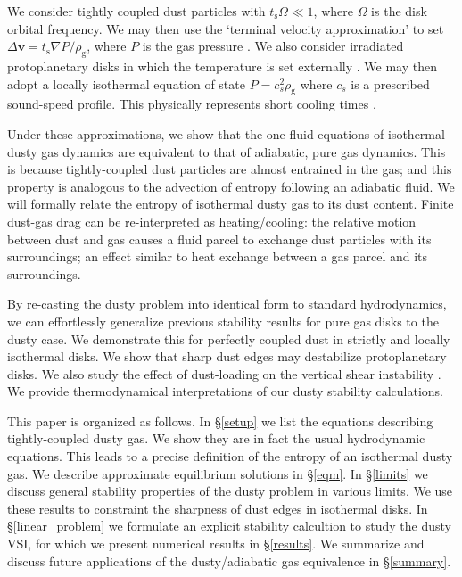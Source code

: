 \documentclass[iop, numberedappendix]{emulateapj}
\newcommand{\rhog}{\rho_\mathrm{g}}
\newcommand{\tstop}{t_\mathrm{s}}
\begin{document}
We consider tightly coupled dust particles with $\tstop\Omega\ll
1$, where $\Omega$ is the disk orbital frequency. We may then use the
`terminal velocity approximation' to set $\Delta \bm{v} = \tstop\nabla
P/\rhog$, where $P$ is the gas pressure \citep{youdin05a,
  jacquet11,laibe14}. We also consider irradiated protoplanetary disks 
in which the temperature is set externally \citep{chiang97,stam08}. We
may then adopt a locally isothermal equation of state $P = c_s^2\rhog$
where $c_s$ is a prescribed sound-speed profile.  This physically
represents short cooling times \citep{lin15}. 

Under these approximations, we show that the one-fluid equations of 
isothermal dusty gas dynamics are equivalent to that of adiabatic, pure gas
dynamics. This is because tightly-coupled dust particles are almost
entrained in the gas; and this property is analogous to the advection
of entropy following an adiabatic fluid. We will formally relate the
entropy of isothermal dusty gas to its dust content. Finite 
dust-gas drag can be re-interpreted as heating/cooling: the relative
motion between dust and gas causes a fluid parcel to exchange dust
particles with its surroundings; an effect similar to heat exchange
between a gas parcel and its surroundings.   


By re-casting the dusty problem into identical form to standard
hydrodynamics, we can effortlessly generalize previous stability
results for pure gas disks to the dusty case. We demonstrate this for
perfectly coupled dust in strictly and locally isothermal disks. We
show that sharp dust edges may destabilize protoplanetary disks.  
We also study the effect of dust-loading on the vertical shear
instability \citep[VSI,][]{nelson13,lin15,barker15}. We provide 
thermodynamical interpretations of our dusty stability calculations. 

This paper is organized as follows. In \S\ref{setup} we list the
equations describing tightly-coupled dusty gas. We show they are in 
fact the usual hydrodynamic equations. This leads to a precise 
definition of the entropy of an isothermal dusty gas. We describe approximate 
equilibrium solutions in \S\ref{eqm}. In \S\ref{limits} we discuss
general stability properties of the dusty problem in various
limits. We use these results to constraint the sharpness of dust edges
in isothermal disks. In \S\ref{linear_problem} we formulate an
explicit stability calcultion to study the dusty VSI, for which we
present numerical results in \S\ref{results}. We summarize and discuss
future applications of the dusty/adiabatic gas equivalence in
\S\ref{summary}. 









\appendix




\end{document}
